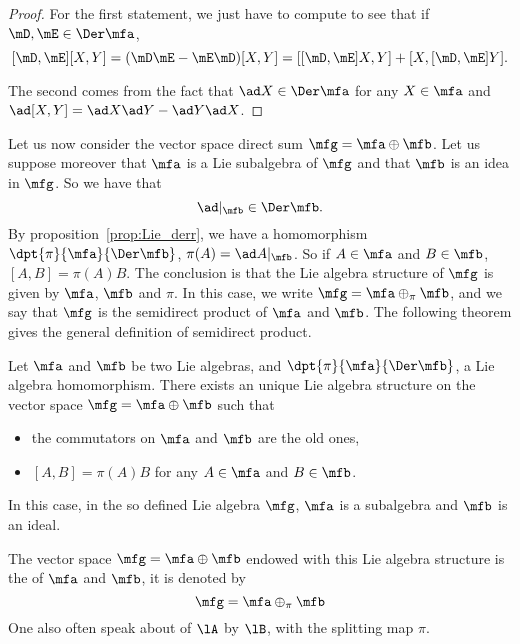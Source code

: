\begin{proof}
    For the first statement, we just have to compute to see that if $\mD,\mE\in\Der\mfa$,
    \[
        [\mD,\mE][X,Y]=(\mD\mE-\mE\mD)[X,Y]=[ [\mD,\mE]X,Y ]+[ X,[\mD,\mE]Y ].
    \]

    The second comes from the fact that $\ad X\in\Der\mfa$ for any $X\in\mfa$ and
    $\ad[X,Y]=\ad X\ad Y-\ad Y\ad X$.
\end{proof}

Let us now consider the vector space direct sum $\mfg=\mfa\oplus\mfb$. Let us suppose moreover that $\mfa$ is a Lie subalgebra of $\mfg$ and that $\mfb$ is an idea in $\mfg$. So we have that
\[
   \ad|_{\mfb}\in\Der\mfb.
\]
By proposition~\ref{prop:Lie_derr}, we have a homomorphism $\dpt{\pi}{\mfa}{\Der\mfb}$, $\pi(A)=\ad A|_{\mfb}$. So if $A\in\mfa$ and $B\in\mfb$, $[A,B]=\pi(A)B$. The conclusion is that the Lie algebra structure of $\mfg$ is given by $\mfa$, $\mfb$ and $\pi$. In this case, we write   $\mfg=\mfa\oplus_{\pi}\mfb$,
and we say that $\mfg$ is the semidirect product of $\mfa$ and $\mfb$. The following theorem gives the general definition of semidirect product.

\begin{theorem}
    Let $\mfa$ and $\mfb$ be two Lie algebras, and $\dpt{\pi}{\mfa}{\Der\mfb}$, a Lie algebra homomorphism. There exists an unique Lie algebra structure on the vector space $\mfg=\mfa\oplus\mfb$ such that
    \begin{itemize}
    \item the commutators on $\mfa$ and $\mfb$ are the old ones,
    \item $[A,B]=\pi(A)B$ for any $A\in\mfa$ and $B\in\mfb$.
    \end{itemize}
    In this case, in the so defined Lie algebra $\mfg$, $\mfa$ is a subalgebra and $\mfb$ is an ideal.
\end{theorem}

The vector space $\mfg=\mfa\oplus\mfb$ endowed with this Lie algebra structure is the
 of $\mfa$ and $\mfb$, it is denoted by
\[
  \mfg=\mfa\oplus_{\pi}\mfb
\]
One also often speak about  of $\lA$ by $\lB$, with the splitting map $\pi$.

